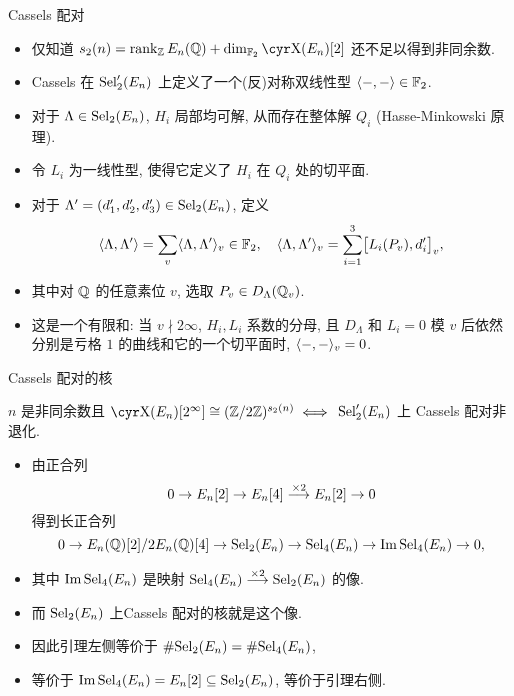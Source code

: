 \documentclass[aspectratio=169]{ctexbeamer}
\begin{document}
\begin{frame}{Cassels 配对}
	\begin{itemize}
		\item 仅知道 $s_2(n)=\rank_\BZ E_n(\BQ)+\dim_{\BF_2}\Sha(E_n)[2]$ 还不足以得到非同余数.
		\item Cassels 在 ${\mathrm{Sel}}_2'(E_n)$ 上定义了一个(反)对称双线性型 $\langle{-,-}\rangle\in{\mathbb{F}}_2$.
		\item 对于 $\Lambda\in{\mathrm{Sel}}_2(E_n)$, $H_i$ 局部均可解, 从而存在整体解 $Q_i$ (Hasse-Minkowski 原理).
		\item 令 $L_i$ 为一线性型, 使得它定义了 $H_i$ 在 $Q_i$ 处的切平面.
		\item 对于 $\Lambda'=(d'_1,d'_2,d'_3)\in{\mathrm{Sel}}_2(E_n)$, 定义
		\[
			\langle{\Lambda,\Lambda'}\rangle=\sum_v\langle{\Lambda,\Lambda'}\rangle_v\in{\mathbb{F}}_2,
			\quad
			\langle{\Lambda,\Lambda'}\rangle_v
			=\sum_{i=1}^3 \bigl[L_i(P_v),d_i'\bigr]_v,
		\]
		\item 其中对 ${\mathbb{Q}}$ 的任意素位 $v$, 选取 $P_v\in D_\Lambda({\mathbb{Q}}_v)$.
		\item 这是一个有限和: 当 $v\nmid 2\infty$, $H_i,L_i$ 系数的分母, 且 $D_\Lambda$ 和 $L_i=0$ 模 $v$ 后依然分别是亏格 $1$ 的曲线和它的一个切平面时, $\langle{-,-}\rangle_v=0$.
	\end{itemize}
\end{frame}


\begin{frame}{Cassels 配对的核}
	\onslide<+->
	\begin{lemma}[][Wang2016]
		$n$ 是非同余数且 $\Sha(E_n)[2^\infty]\cong(\BZ/2\BZ)^{s_2(n)}\iff$
		${\mathrm{Sel}}_2'(E_n)$ 上 Cassels 配对非退化.
	\end{lemma}
	\begin{itemize}
		\item 由正合列
		\[
			0\rightarrow E_n[2]\rightarrow E_n[4] \stackrel{\times 2}{\longrightarrow} E_n[2]\rightarrow 0
		\]
		得到长正合列
		\[
			0\rightarrow {E_n({\mathbb{Q}})[2]}/{2E_n({\mathbb{Q}})[4]}\rightarrow {\mathrm{Sel}}_2(E_n)\rightarrow {\mathrm{Sel}}_4(E_n)\rightarrow \operatorname{Im} {\mathrm{Sel}}_4(E_n)\rightarrow 0,
		\]
		\item 其中 $\operatorname{Im} {\mathrm{Sel}}_4(E_n)$ 是映射 ${\mathrm{Sel}}_4(E_n)\stackrel{\times 2}{\longrightarrow} {\mathrm{Sel}}_2(E_n)$ 的像.
		\item 而 ${\mathrm{Sel}}_2(E_n)$ 上Cassels 配对的核就是这个像.
		\item 因此引理左侧等价于 $\#{\mathrm{Sel}}_2(E_n) = \#{\mathrm{Sel}}_4(E_n)$, 
		\item 等价于 $\operatorname{Im} {\mathrm{Sel}}_4(E_n)=E_n[2]\subseteq {\mathrm{Sel}}_2(E_n)$, 等价于引理右侧.
	\end{itemize}
\end{frame}
\end{document}
